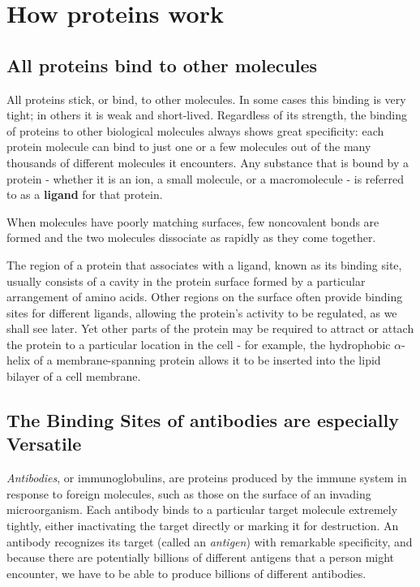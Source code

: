 \section{How proteins work}

\subsection{All proteins bind to other molecules}

All proteins stick, or bind, to other molecules. In some cases this binding is
very tight; in others it is weak and short-lived.
Regardless of its strength, the binding
of proteins to other biological molecules always shows great specificity:
each protein molecule can bind to just one or a few molecules out of
the many thousands of different molecules it encounters. Any substance
that is bound by a protein - whether it is an ion, a small molecule, or a
macromolecule - is referred to as a \textbf{ligand} for that protein.

When molecules have poorly matching surfaces, few noncovalent bonds
are formed and the two molecules dissociate as rapidly as they come
together.

The region of a protein that associates with a ligand, known as its binding site,
usually consists of a cavity in the protein surface formed by a
particular arrangement of amino acids. Other regions on the surface often provide
binding sites for different ligands, allowing the protein’s
activity to be regulated, as we shall see later. Yet other parts of the protein
may be required to attract or attach the protein to a particular location in
the cell - for example, the hydrophobic $\alpha$-helix of a membrane-spanning
protein allows it to be inserted into the lipid bilayer of a cell membrane.

\subsection{The Binding Sites of antibodies are especially Versatile}

\textit{Antibodies}, or immunoglobulins, are proteins produced by the immune
system in response to foreign molecules, such as those on the surface
of an invading microorganism. Each antibody binds to a particular target
molecule extremely tightly, either inactivating the target directly or
marking it for destruction. An antibody recognizes its target (called an
\textit{antigen}) with remarkable specificity, and because there are potentially
billions of different antigens that a person might encounter, we have to
be able to produce billions of different antibodies.

